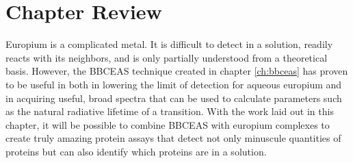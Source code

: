 \section*{Chapter Review}

Europium is a complicated metal. It is difficult to detect in a solution,
readily reacts with its neighbors, and is only partially understood from a
theoretical basis. However, the \ac{BBCEAS} technique created in chapter
\ref{ch:bbceas} has proven to be useful in both in lowering the limit of
detection for aqueous europium and in acquiring useful, broad spectra that
can be used to calculate parameters such as the natural radiative lifetime of
a transition. With the work laid out in this chapter, it will be possible to
combine \ac{BBCEAS} with europium complexes to create truly amazing protein
assays that detect not only minuscule quantities of proteins but can also
identify which proteins are in a solution.
